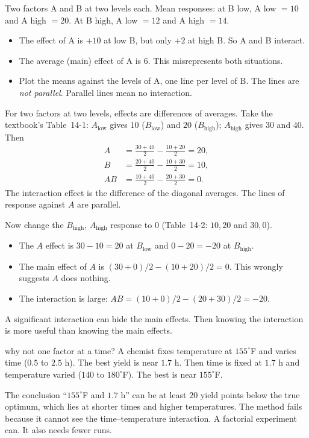 \begin{example}\label{ex:interaction}
Two factors A and B at two levels each. Mean responses: at B low, A low $=10$ and A high $=20$. At B high, A low $=12$ and A high $=14$.
\begin{itemize}
  \item The effect of A is $+10$ at low B, but only $+2$ at high B. So A and B interact.
  \item The average (main) effect of A is $6$. This misrepresents both situations.
  \item Plot the means against the levels of A, one line per level of B. The lines are \emph{not parallel}. Parallel lines mean no interaction.
\end{itemize}
\end{example}

For two factors at two levels, effects are differences of averages. Take the textbook's Table~14-1: $A_{\text{low}}$ gives $10$ ($B_{\text{low}}$) and $20$ ($B_{\text{high}}$); $A_{\text{high}}$ gives $30$ and $40$. Then
\begin{align*}
A&=\frac{30+40}2-\frac{10+20}2=20,\\
B&=\frac{20+40}2-\frac{10+30}2=10,\\
AB&=\frac{10+40}2-\frac{20+30}2=0.
\end{align*}
The interaction effect is the difference of the diagonal averages. The lines of response against $A$ are parallel.

Now change the $B_{\text{high}}$, $A_{\text{high}}$ response to $0$ (Table~14-2: $10,20$ and $30,0$).
\begin{itemize}
  \item The $A$ effect is $30-10=20$ at $B_{\text{low}}$ and $0-20=-20$ at $B_{\text{high}}$.
  \item The main effect of $A$ is $(30+0)/2-(10+20)/2=0$. This wrongly suggests $A$ does nothing.
  \item The interaction is large: $AB=(10+0)/2-(20+30)/2=-20$.
\end{itemize}
A significant interaction can hide the main effects. Then knowing the interaction is more useful than knowing the main effects.

\begin{nuance}{why not one factor at a time?}
A chemist fixes temperature at $155^\circ$F and varies time ($0.5$ to $2.5$ h). The best yield is near $1.7$ h. Then time is fixed at $1.7$ h and temperature varied ($140$ to $180^\circ$F). The best is near $155^\circ$F.

The conclusion ``$155^\circ$F and $1.7$ h'' can be at least $20$ yield points below the true optimum, which lies at shorter times and higher temperatures. The method fails because it cannot see the time--temperature interaction. A factorial experiment can. It also needs fewer runs.
\end{nuance}


